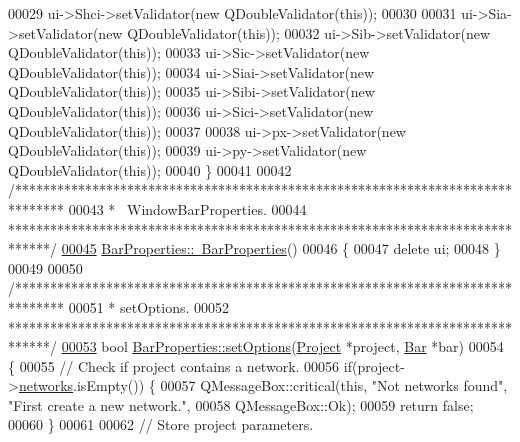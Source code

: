 \begin{DoxyCode}
00029   ui->Shci->setValidator(\textcolor{keyword}{new} QDoubleValidator(\textcolor{keyword}{this}));
00030 
00031   ui->Sia->setValidator(\textcolor{keyword}{new} QDoubleValidator(\textcolor{keyword}{this}));
00032   ui->Sib->setValidator(\textcolor{keyword}{new} QDoubleValidator(\textcolor{keyword}{this}));
00033   ui->Sic->setValidator(\textcolor{keyword}{new} QDoubleValidator(\textcolor{keyword}{this}));
00034   ui->Siai->setValidator(\textcolor{keyword}{new} QDoubleValidator(\textcolor{keyword}{this}));
00035   ui->Sibi->setValidator(\textcolor{keyword}{new} QDoubleValidator(\textcolor{keyword}{this}));
00036   ui->Sici->setValidator(\textcolor{keyword}{new} QDoubleValidator(\textcolor{keyword}{this}));
00037 
00038   ui->px->setValidator(\textcolor{keyword}{new} QDoubleValidator(\textcolor{keyword}{this}));
00039   ui->py->setValidator(\textcolor{keyword}{new} QDoubleValidator(\textcolor{keyword}{this}));
00040 \}
00041 
00042 \textcolor{comment}{/*******************************************************************************}
00043 \textcolor{comment}{ * ~WindowBarProperties.}
00044 \textcolor{comment}{ ******************************************************************************/}
\hypertarget{barproperties_8cpp_source_l00045}{}\hyperlink{class_bar_properties_a639b4da849970025a2935ee965d6a465}{00045} \hyperlink{class_bar_properties_a639b4da849970025a2935ee965d6a465}{BarProperties::~BarProperties}()
00046 \{
00047   \textcolor{keyword}{delete} ui;
00048 \}
00049 
00050 \textcolor{comment}{/*******************************************************************************}
00051 \textcolor{comment}{ * setOptions.}
00052 \textcolor{comment}{ ******************************************************************************/}
\hypertarget{barproperties_8cpp_source_l00053}{}\hyperlink{class_bar_properties_a0a9a2284b5aad8acbade86ccec7adbf8}{00053} \textcolor{keywordtype}{bool} \hyperlink{class_bar_properties_a0a9a2284b5aad8acbade86ccec7adbf8}{BarProperties::setOptions}(\hyperlink{class_project}{Project} *project, 
      \hyperlink{class_bar}{Bar} *bar)
00054 \{
00055   \textcolor{comment}{// Check if project contains a network.}
00056   \textcolor{keywordflow}{if}(project->\hyperlink{class_project_aa98126154cab59769a431668e6f17daf}{networks}.isEmpty()) \{
00057     QMessageBox::critical(\textcolor{keyword}{this}, \textcolor{stringliteral}{"Not networks found"}, \textcolor{stringliteral}{"First create a new network."},
00058                           QMessageBox::Ok);
00059     \textcolor{keywordflow}{return} \textcolor{keyword}{false};
00060   \}
00061 
00062   \textcolor{comment}{// Store project parameters.}

\end{DoxyCode}
